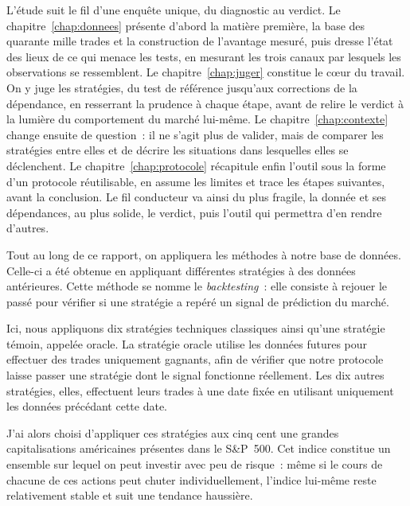 L'étude suit le fil d'une enquête unique, du diagnostic au verdict. Le
chapitre~\ref{chap:donnees} présente d'abord la matière première, la
base des quarante mille trades et la construction de l'avantage mesuré,
puis dresse l'état des lieux de ce qui menace les tests, en mesurant les
trois canaux par lesquels les observations se ressemblent. Le
chapitre~\ref{chap:juger} constitue le c\oe ur du travail. On y juge les
stratégies, du test de référence jusqu'aux corrections de la dépendance,
en resserrant la prudence à chaque étape, avant de relire le verdict à
la lumière du comportement du marché lui-même. Le
chapitre~\ref{chap:contexte} change ensuite de question~: il ne s'agit
plus de valider, mais de comparer les stratégies entre elles et de
décrire les situations dans lesquelles elles se déclenchent. Le
chapitre~\ref{chap:protocole} récapitule enfin l'outil sous la forme
d'un protocole réutilisable, en assume les limites et trace les étapes
suivantes, avant la conclusion. Le fil conducteur va ainsi du plus
fragile, la donnée et ses dépendances, au plus solide, le verdict, puis
l'outil qui permettra d'en rendre d'autres.




Tout au long de ce rapport, on appliquera les méthodes à notre base de
données. Celle-ci a été obtenue en appliquant différentes stratégies à
des données antérieures. Cette méthode se nomme le \emph{backtesting}~:
elle consiste à rejouer le passé pour vérifier si une stratégie a repéré
un signal de prédiction du marché.

Ici, nous appliquons dix stratégies techniques classiques ainsi qu'une
stratégie témoin, appelée oracle. La stratégie oracle utilise les
données futures pour effectuer des trades uniquement gagnants, afin de
vérifier que notre protocole laisse passer une stratégie dont le signal
fonctionne réellement. Les dix autres stratégies, elles, effectuent
leurs trades à une date fixée en utilisant uniquement les données
précédant cette date.


J'ai alors choisi d'appliquer ces stratégies aux cinq cent une grandes
capitalisations américaines présentes dans le S\&P~500. Cet indice
constitue un ensemble sur lequel on peut investir avec peu de risque~:
même si le cours de chacune de ces actions peut chuter individuellement,
l'indice lui-même reste relativement stable et suit une tendance
haussière.

